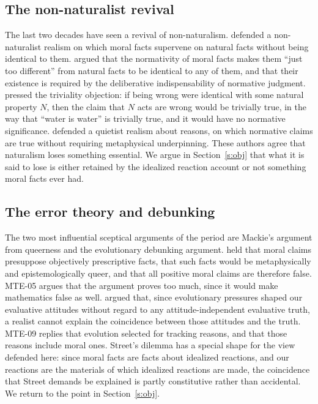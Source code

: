\documentclass{situationist-preprint}
\begin{document}
\subsection{The non-naturalist revival}

The last two decades have seen a revival of non-naturalism. \citet{ShaferLandau2003} defended a non-naturalist realism on which moral facts supervene on natural facts without being identical to them. \citet{Enoch2011} argued that the normativity of moral facts makes them \enquote{just too different} from natural facts to be identical to any of them, and that their existence is required by the deliberative indispensability of normative judgment. \citet{Parfit2011} pressed the triviality objection: if being wrong were identical with some natural property $N$, then the claim that $N$ acts are wrong would be trivially true, in the way that \enquote{water is water} is trivially true, and it would have no normative significance. \citet{Scanlon2014} defended a quietist realism about reasons, on which normative claims are true without requiring metaphysical underpinning. These authors agree that naturalism loses something essential. We argue in Section~\ref{s:obj} that what it is said to lose is either retained by the idealized reaction account or not something moral facts ever had.

\subsection{The error theory and debunking}

The two most influential sceptical arguments of the period are Mackie's argument from queerness and the evolutionary debunking argument. \citet{Mackie1977} held that moral claims presuppose objectively prescriptive facts, that such facts would be metaphysically and epistemologically queer, and that all positive moral claims are therefore false. MTE-05 argues that the argument proves too much, since it would make mathematics false as well. \citet{Street2006} argued that, since evolutionary pressures shaped our evaluative attitudes without regard to any attitude-independent evaluative truth, a realist cannot explain the coincidence between those attitudes and the truth. MTE-09 replies that evolution selected for tracking reasons, and that those reasons include moral ones. Street's dilemma has a special shape for the view defended here: since moral facts are facts about idealized reactions, and our reactions are the materials of which idealized reactions are made, the coincidence that Street demands be explained is partly constitutive rather than accidental. We return to the point in Section~\ref{s:obj}.
\end{document}
